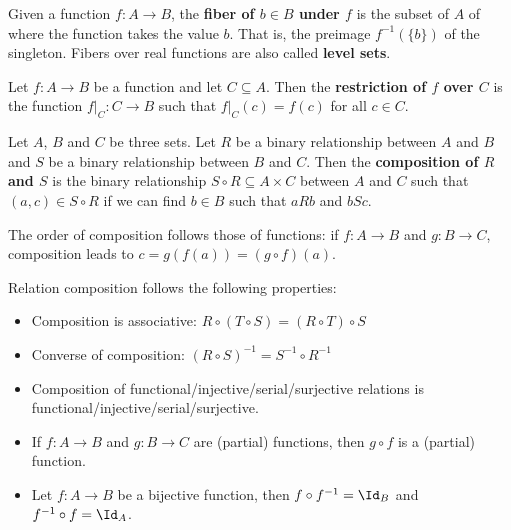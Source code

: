 \documentclass{bareminimum}
\begin{document}
\begin{defn}[Fiber]
	Given  a function $f : A \to B$, the \textbf{fiber of $b \in B$ under $f$} is the subset of $A$ of where the function takes the value $b$. That is, the preimage $f^{-1}(\{b\})$ of the singleton. Fibers over real functions are also called \textbf{level sets}.
\end{defn}


\begin{defn}[Restriction]
	Let $f : A  \to B$  be a function and let $C \subseteq A$. Then the \textbf{restriction of $f$ over $C$} is the function $f|_C : C \to B$ such that $f|_C(c) = f(c)$ for all $c \in C$.
\end{defn}

\begin{defn}[Composition]
	Let $A$, $B$ and $C$  be three sets. Let $R$ be a binary relationship between $A$ and $B$ and $S$ be a binary relationship between $B$ and $C$. Then the \textbf{composition of $R$ and $S$} is the binary relationship $S \circ R \subseteq A \times C$ between $A$ and $C$ such that $(a, c) \in S \circ R$ if we can find $b \in B$ such that $aRb$ and $bSc$.
\end{defn}

\begin{remark}
	The order of composition follows those of functions: if $f : A \to B$ and $g : B \to C$, composition leads to $c = g(f(a)) = (g \circ f)(a)$.
\end{remark}

\begin{prop}
	Relation composition  follows the following properties:
	\begin{itemize}
		\item Composition is associative: $R \circ (T \circ S) = (R \circ T) \circ S$
		\item Converse of composition: $(R \circ S)^{-1} = S^{-1} \circ R^{-1}$
		\item Composition of functional/injective/serial/surjective relations is \\ functional/injective/serial/surjective.
		\item If $f : A \to B$ and $g : B \to C$ are (partial) functions, then $g \circ f$ is a (partial) function.
		\item Let $f : A \to B$ be a bijective function, then $f \circ f^{-1} = \Id_B$ and $f^{-1} \circ f = \Id_A$.
	\end{itemize}
\end{prop}
\end{document}
